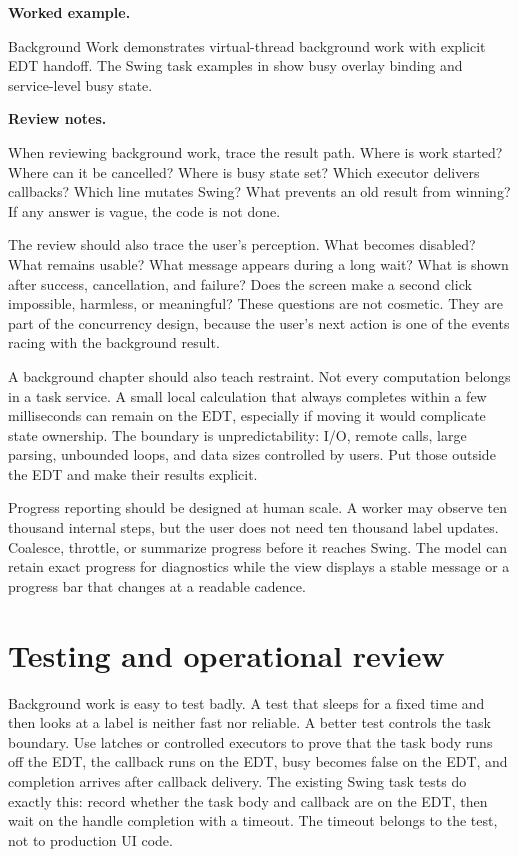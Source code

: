 \textbf{Worked example.}

\begin{examplebox}{Background Work}
\modernJavaExample{} demonstrates virtual-thread background work with explicit
EDT handoff. The Swing task examples in  show busy overlay
binding and service-level busy state.
\end{examplebox}

\textbf{Review notes.}

When reviewing background work, trace the result path. Where is work started?
Where can it be cancelled? Where is busy state set? Which executor delivers
callbacks? Which line mutates Swing? What prevents an old result from winning?
If any answer is vague, the code is not done.

The review should also trace the user's perception. What becomes disabled? What
remains usable? What message appears during a long wait? What is shown after
success, cancellation, and failure? Does the screen make a second click
impossible, harmless, or meaningful? These questions are not cosmetic. They are
part of the concurrency design, because the user's next action is one of the
events racing with the background result.

A background chapter should also teach restraint. Not every computation belongs
in a task service. A small local calculation that always completes within a few
milliseconds can remain on the EDT, especially if moving it would complicate
state ownership. The boundary is unpredictability: I/O, remote calls, large
parsing, unbounded loops, and data sizes controlled by users. Put those outside
the EDT and make their results explicit.

Progress reporting should be designed at human scale. A worker may observe ten
thousand internal steps, but the user does not need ten thousand label updates.
Coalesce, throttle, or summarize progress before it reaches Swing. The model can
retain exact progress for diagnostics while the view displays a stable message
or a progress bar that changes at a readable cadence.

\section{Testing and operational review}

Background work is easy to test badly. A test that sleeps for a fixed time and
then looks at a label is neither fast nor reliable. A better test controls the
task boundary. Use latches or controlled executors to prove that the task body
runs off the EDT, the callback runs on the EDT, busy becomes false on the EDT,
and completion arrives after callback delivery. The existing Swing task tests
do exactly this: record whether the task body and callback are on the EDT, then
wait on the handle completion with a timeout. The timeout belongs to the test,
not to production UI code.

